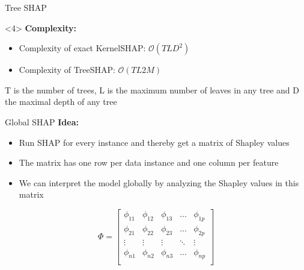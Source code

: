 \documentclass[11pt,compress,t,notes=noshow, aspectratio=169, xcolor=table]{beamer}
\begin{document}
\begin{vbframe}{Tree SHAP }
\begin{onlyenv}<4>
\vspace{1.5cm}
\textbf{Complexity:}
\begin{itemize}
    \item Complexity of exact KernelSHAP: $\mathcal{O}(TLD^2)$
    \item Complexity of TreeSHAP: $\mathcal{O}(TL2M)$
\end{itemize}

T is the number of trees, L is the maximum number of leaves in any tree and D the maximal depth of any tree
\end{onlyenv}


\end{vbframe}

 \begin{vbframe}{Global SHAP }
\textbf{Idea: }
\begin{itemize}
    \item Run SHAP for every instance and thereby get a matrix of Shapley values
    \item The matrix has one row per data instance and one column per feature
    \item We can interpret the model globally by analyzing the Shapley values in this matrix
\end{itemize}
\vspace{2cm}
$$
\Phi =
\begin{bmatrix}
    \phi_{11} & \phi_{12} & \phi_{13} & \dots  & \phi_{1p} \\
    \phi_{21} & \phi_{22} & \phi_{23} & \dots  & \phi_{2p} \\
    \vdots & \vdots & \vdots & \ddots & \vdots \\
    \phi_{n1} & \phi_{n2} & \phi_{n3} & \dots  & \phi_{np} \\
\end{bmatrix}
$$

 \end{vbframe}
\end{document}

